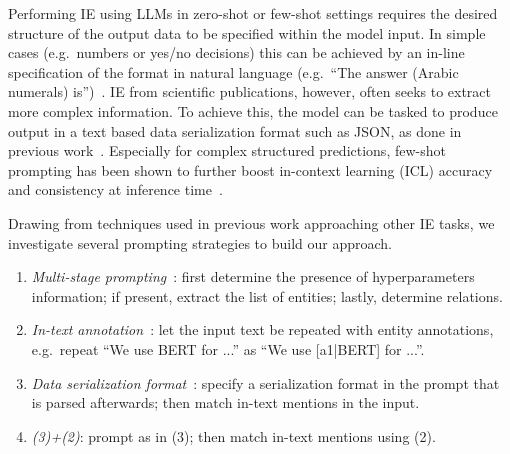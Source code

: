 
Performing IE using LLMs in zero-shot or few-shot settings requires the desired structure of the output data to be specified within the model input. In simple cases (e.g.\ numbers or yes/no decisions) this can be achieved by an in-line specification of the format in natural language (e.g.\ ``The answer (Arabic numerals) is'')~\cite{Kojima2022}. IE from scientific publications, however, often seeks to extract more complex information. To achieve this, the model can be tasked to produce output in a text based data serialization format such as JSON, as done in previous work~\cite{Dunn2022}. Especially for complex structured predictions, few-shot prompting has been shown to further boost in-context learning (ICL) accuracy and consistency at inference time~\cite{Brown2020gpt3}.

Drawing from techniques used in previous work approaching other IE tasks, we investigate several prompting strategies to build our approach.
%
%

\begin{enumerate}
    \item \textit{Multi-stage prompting}~\cite{Polak2023}: first determine the presence of hyperparameters information; if present, extract the list of entities; lastly, determine relations.
    \item \textit{In-text annotation}~\cite{Wang2023}: let the input text be repeated with entity annotations, e.g.\ repeat ``We use BERT for ...'' as ``We use [a1|BERT] for ...''. %
    \item \textit{Data serialization format}~\cite{Dunn2022}: specify a serialization format in the prompt that is parsed afterwards; then match in-text mentions in the input.
    \item \textit{(3)+(2)}: prompt as in (3); then match in-text mentions using (2).
\end{enumerate}

